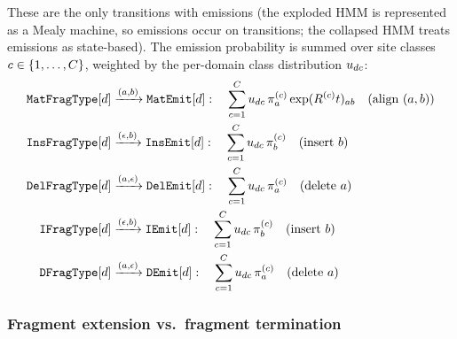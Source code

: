 \documentclass{article}
\newcommand{\eqm}{\pi}
\begin{document}
These are the only transitions with emissions (the exploded HMM is represented as a Mealy machine, so emissions occur on transitions; the collapsed HMM treats emissions as state-based).
The emission probability is summed over site classes $c \in \{1,\ldots,C\}$,
weighted by the per-domain class distribution $u_{dc}$:
\begin{align}
\mkfragtype{d} &\xrightarrow{(\anctok,\destok)} \mkfragemit{d}: \quad \sum_{\class=1}^{\nclasses} \classdist_{d\class}\, \eqm^{(\class)}_\anctok \exp(\revsub^{(\class)} \evoltime)_{\anctok\destok}
  \quad\text{(align $(\anctok,\destok)$)} \\
\mkifragtype{d} &\xrightarrow{(\epsilon,\destok)} \mkifragemit{d}: \quad \sum_{\class=1}^{\nclasses} \classdist_{d\class}\, \eqm^{(\class)}_\destok
  \quad\text{(insert $\destok$)} \\
\mkdfragtype{d} &\xrightarrow{(\anctok,\epsilon)} \mkdfragemit{d}: \quad \sum_{\class=1}^{\nclasses} \classdist_{d\class}\, \eqm^{(\class)}_\anctok
  \quad\text{(delete $\anctok$)} \\
\ikfragtype{d} &\xrightarrow{(\epsilon,\destok)} \ikfragemit{d}: \quad \sum_{\class=1}^{\nclasses} \classdist_{d\class}\, \eqm^{(\class)}_\destok
  \quad\text{(insert $\destok$)} \\
\dkfragtype{d} &\xrightarrow{(\anctok,\epsilon)} \dkfragemit{d}: \quad \sum_{\class=1}^{\nclasses} \classdist_{d\class}\, \eqm^{(\class)}_\anctok
  \quad\text{(delete $\anctok$)}
\end{align}

\subsubsection{Fragment extension vs.\ fragment termination}
\label{sec:mixdom-frag-trans}
\end{document}
